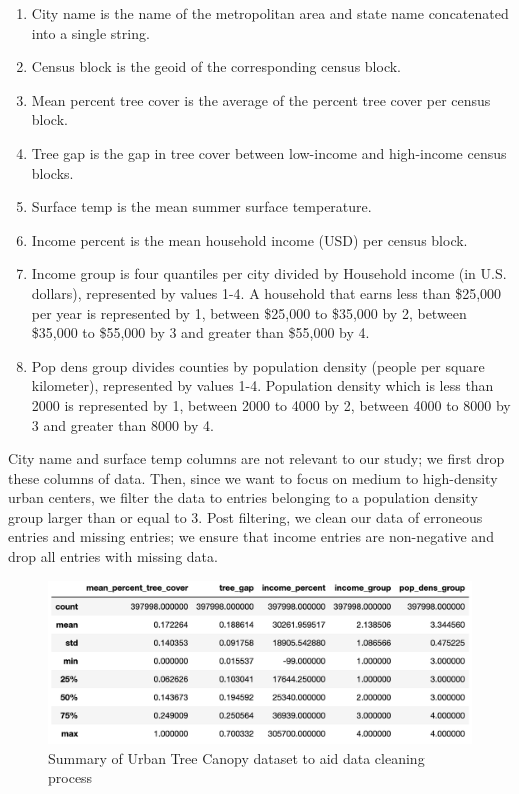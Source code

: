 \documentclass{article}
\begin{document}
\begin{enumerate}
    \item City name is the name of the metropolitan area and state name concatenated into a single string. 
    \item Census block is the geoid of the corresponding census block.
    \item Mean percent tree cover is the average of the percent tree cover per census block.
    \item Tree gap is the gap in tree cover between low-income and high-income census blocks.
    \item Surface temp is the mean summer surface temperature. 
    \item Income percent is the mean household income (USD) per census block. 
    \item Income group is four quantiles per city divided by Household income (in U.S. dollars), represented by values 1-4. A household that earns less than \$25,000 per year is represented by 1, between \$25,000 to \$35,000 by 2, between \$35,000 to \$55,000 by 3 and greater than \$55,000 by 4. 
    \item Pop dens group divides counties by population density (people per square kilometer), represented by values 1-4. Population density which is less than 2000 is represented by 1, between 2000 to 4000 by 2, between 4000 to 8000 by 3 and greater than 8000 by 4. 

    
\end{enumerate}
       
City name and surface temp columns are not relevant to our study; we first drop these columns of data. Then, since we want to focus on medium to high-density urban centers, we filter the data to entries belonging to a population density group larger than or equal to 3. Post filtering, we clean our data of erroneous entries and missing entries; we ensure that income entries are non-negative and drop all entries with missing data.\\

\begin{figure}[H]
    \centering
    \includegraphics[scale = 0.5]{summ_urban.png}
    \caption{Summary of Urban Tree Canopy dataset to aid data cleaning process}
    \label{fig:my_label}
\end{figure}
\end{document}
